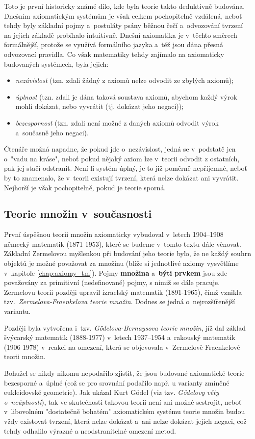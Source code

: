 Toto je první historicky známé dílo, kde byla teorie takto deduktivně budována. Dnešním axiomatickým systémům je však celkem pochopitelně vzdálená, neboť tehdy byly základní pojmy a~postuláty psány běžnou řečí a~odvozování tvrzení na jejich základě probíhalo intuitivně. Dnešní axiomatika je v~těchto směrech formálnější, protože se využívá formálního jazyka a~též jsou dána přesná odvozovací pravidla. Co však matematiky tehdy zajímalo na axiomaticky budovaných systémech, byla jejich:
\begin{itemize}
\item \emph{nezávislost} (tzn. zdali žádný z axiomů nelze odvodit ze zbylých axiomů);
\item \emph{úplnost} (tzn. zdali je dána taková soustava axiomů, abychom každý výrok mohli dokázat, nebo vyvrátit (tj. dokázat jeho negaci));
\item \emph{bezespornost} (tzn. zdali není možné z daných axiomů odvodit výrok a~současně jeho negaci).
\end{itemize}
Čtenáře možná napadne, že pokud jde o~nezávislost, jedná se v~podstatě jen o~"vadu na kráse", neboť pokud nějaký axiom lze v~teorii odvodit z ostatních, pak jej stačí odstranit. Není-li systém úplný, je to již poměrně nepříjemné, neboť by to znamenalo, že v~teorii existují tvrzení, která nelze dokázat ani vyvrátit. Nejhorší je však pochopitelně, pokud je teorie sporná.

\subsection{Teorie množin v~současnosti}\label{subsec:tm_soucasnost}

První úspěšnou teorii množin axiomaticky vybudoval v~letech 1904--1908 německý matematik  \mbox{(1871-1953)}, které se budeme v~tomto textu dále věnovat. Základní Zermelovou myšlenkou při budování jeho teorie bylo, že ne každý souhrn objektů je možné považovat za množinu (blíže si jednotlivé axiomy vysvětlíme v~kapitole \ref{chap:axiomy_tm}). Pojmy \textbf{množina} a~\textbf{býti prvkem} jsou zde považovány za primitivní (nedefinované) pojmy, s nimiž se dále pracuje. Zermelovu teorii později upravil izraelský matematik  \mbox{(1891-1965)}, čímž vznikla tzv.~\emph{\mbox{Zermelova-Fraenkelova} teorie množin}. Dodnes se jedná o~nejrozšířenější variantu.\par
Později byla vytvořena i~tzv. \emph{Gödelova-Bernaysova teorie množin}, jíž dal základ švýcarský matematik  \mbox{(1888-1977)} v~letech 1937--1954 a~rakouský matematik  \mbox{(1906-1978)} v~reakci na omezení, která se objevovala v~\mbox{Zermelově-Fraenkelově} teorii množin.
\medskip

Bohužel se nikdy nikomu nepodařilo zjistit, že jsou budované axiomatické teorie bezesporné a~úplné (což se pro srovnání podařilo např. u varianty zmíněné eukleidovské geometrie). Jak ukázal Kurt Gödel (viz tzv. \emph{Gödelovy věty o~neúplnosti}), tak ve skutečnosti takovou teorii není ani možné sestrojit, neboť v~libovolném "dostatečně bohatém" axiomatickém systému teorie množin budou vždy existovat tvrzení, která nelze dokázat a~ani nelze dokázat jejich negaci, což tehdy odhalilo výrazné a neodstranitelné omezení metod. 
